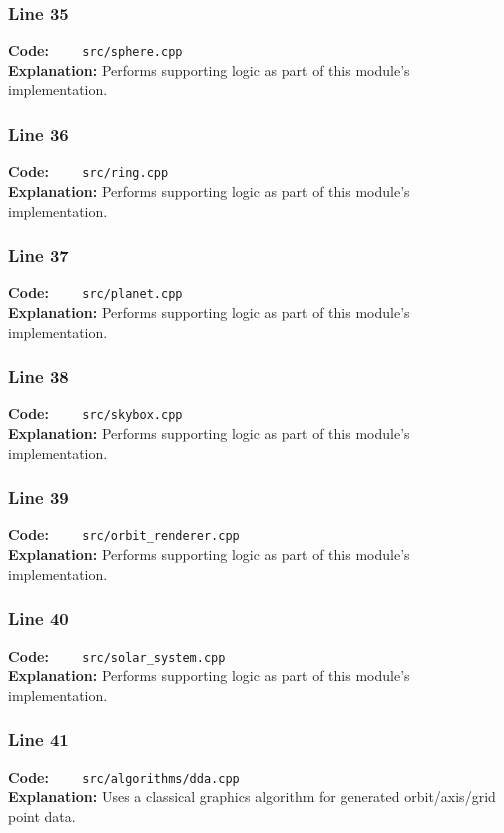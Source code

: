 \documentclass[11pt,a4paper]{article}
\begin{document}
\subsubsection*{Line 35}
\textbf{Code:} \verb|    src/sphere.cpp|\\
\textbf{Explanation:} Performs supporting logic as part of this module's implementation.

\subsubsection*{Line 36}
\textbf{Code:} \verb|    src/ring.cpp|\\
\textbf{Explanation:} Performs supporting logic as part of this module's implementation.

\subsubsection*{Line 37}
\textbf{Code:} \verb|    src/planet.cpp|\\
\textbf{Explanation:} Performs supporting logic as part of this module's implementation.

\subsubsection*{Line 38}
\textbf{Code:} \verb|    src/skybox.cpp|\\
\textbf{Explanation:} Performs supporting logic as part of this module's implementation.

\subsubsection*{Line 39}
\textbf{Code:} \verb|    src/orbit_renderer.cpp|\\
\textbf{Explanation:} Performs supporting logic as part of this module's implementation.

\subsubsection*{Line 40}
\textbf{Code:} \verb|    src/solar_system.cpp|\\
\textbf{Explanation:} Performs supporting logic as part of this module's implementation.

\subsubsection*{Line 41}
\textbf{Code:} \verb|    src/algorithms/dda.cpp|\\
\textbf{Explanation:} Uses a classical graphics algorithm for generated orbit/axis/grid point data.
\end{document}
